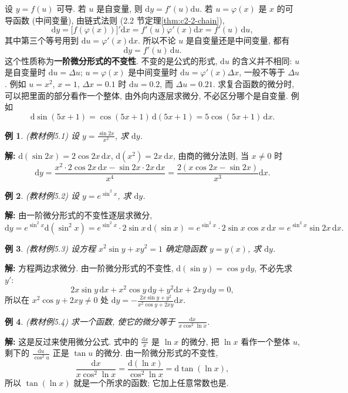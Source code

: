 \documentclass[UTF8,openany]{ctexbook}
\theoremstyle{chinesetextbook}
\newtheorem{example}{例}[section]
\newenvironment{cnsolution}{\par\indent\textbf{解:} \ignorespaces}{\par}
\newcommand{\dd}{\mathrm d}
\begin{document}
设 $y=f(u)$ 可导. 若 $u$ 是自变量, 则 $\dd y=f'(u)\dd u$. 若 $u=\varphi(x)$ 是 $x$ 的可导函数 (中间变量), 由链式法则 (2.2 节定理\ref{thm:c2-2-chain}),
\[
\dd y=\bigl[f(\varphi(x))\bigr]'\dd x=f'(u)\varphi'(x)\dd x=f'(u)\,\dd u,
\]
其中第三个等号用到 $\dd u=\varphi'(x)\dd x$. 所以不论 $u$ 是自变量还是中间变量, 都有
\[
\dd y=f'(u)\,\dd u.
\]
这个性质称为\textbf{一阶微分形式的不变性}. 不变的是公式的形式, $\dd u$ 的含义并不相同: $u$ 是自变量时 $\dd u=\Delta u$; $u=\varphi(x)$ 是中间变量时 $\dd u=\varphi'(x)\Delta x$, 一般不等于 $\Delta u$. 例如 $u=x^2$, $x=1$, $\Delta x=0.1$ 时 $\dd u=0.2$, 而 $\Delta u=0.21$. 求复合函数的微分时, 可以把里面的部分看作一个整体, 由外向内逐层求微分, 不必区分哪个是自变量. 例如
\[
\dd\sin(5x+1)=\cos(5x+1)\,\dd(5x+1)=5\cos(5x+1)\,\dd x.
\]
\begin{example}\label{ex:c2-5-1}
\textnormal{(教材例5.1)} 设 $\displaystyle y=\frac{\sin2x}{x^2}$, 求 $\dd y$.
\end{example}
\begin{cnsolution}
$\dd(\sin2x)=2\cos2x\,\dd x$, $\dd(x^2)=2x\,\dd x$, 由商的微分法则, 当 $x\ne0$ 时
\[
\dd y=\frac{x^2\cdot2\cos2x\,\dd x-\sin2x\cdot2x\,\dd x}{x^4}=\frac{2(x\cos2x-\sin2x)}{x^3}\dd x.
\]
\end{cnsolution}
\begin{example}\label{ex:c2-5-2}
\textnormal{(教材例5.2)} 设 $y=e^{\sin^2x}$, 求 $\dd y$.
\end{example}
\begin{cnsolution}
由一阶微分形式的不变性逐层求微分,
\[
\dd y=e^{\sin^2x}\dd(\sin^2x)=e^{\sin^2x}\cdot2\sin x\,\dd(\sin x)=e^{\sin^2x}\cdot2\sin x\cos x\,\dd x=e^{\sin^2x}\sin2x\,\dd x.
\]
\end{cnsolution}
\begin{example}\label{ex:c2-5-3}
\textnormal{(教材例5.3)} 设方程 $x^2\sin y+xy^2=1$ 确定隐函数 $y=y(x)$, 求 $\dd y$.
\end{example}
\begin{cnsolution}
方程两边求微分. 由一阶微分形式的不变性, $\dd(\sin y)=\cos y\,\dd y$, 不必先求 $y'$:
\[
2x\sin y\,\dd x+x^2\cos y\,\dd y+y^2\dd x+2xy\,\dd y=0,
\]
所以在 $x^2\cos y+2xy\ne0$ 处 $\displaystyle\dd y=-\frac{2x\sin y+y^2}{x^2\cos y+2xy}\dd x$.
\end{cnsolution}
\begin{example}\label{ex:c2-5-4}
\textnormal{(教材例5.4)} 求一个函数, 使它的微分等于 $\displaystyle\frac{\dd x}{x\cos^2\ln x}$.
\end{example}
\begin{cnsolution}
这是反过来使用微分公式. 式中的 $\displaystyle\frac{\dd x}x$ 是 $\ln x$ 的微分, 把 $\ln x$ 看作一个整体 $u$, 剩下的 $\displaystyle\frac{\dd u}{\cos^2u}$ 正是 $\tan u$ 的微分. 由一阶微分形式的不变性,
\[
\frac{\dd x}{x\cos^2\ln x}=\frac{\dd(\ln x)}{\cos^2\ln x}=\dd\tan(\ln x),
\]
所以 $\tan(\ln x)$ 就是一个所求的函数; 它加上任意常数也是.
\end{cnsolution}
\end{document}
